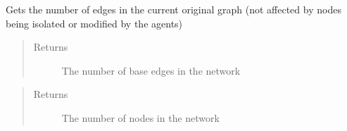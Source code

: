 \documentclass[letterpaper,10pt,english]{sphinxmanual}
\begin{document}
\begin{fulllineitems}
\begin{fulllineitems}
\begin{quote}
\begin{description}
\end{description}\end{quote}

\end{fulllineitems}


\begin{fulllineitems}
\label{\detokenize{source/yawning_titan.envs.generic.core:yawning_titan.envs.generic.core.network_interface.NetworkInterface.get_number_current_edges}}
\sphinxAtStartPar
Gets the number of edges in the current original graph (not affected by nodes being isolated or modified by the
agents)
\begin{quote}\begin{description}
\item[{Returns}] \leavevmode
\sphinxAtStartPar
The number of base edges in the network

\end{description}\end{quote}

\end{fulllineitems}


\begin{fulllineitems}
\label{\detokenize{source/yawning_titan.envs.generic.core:yawning_titan.envs.generic.core.network_interface.NetworkInterface.get_number_of_nodes}}\begin{quote}\begin{description}
\item[{Returns}] \leavevmode
\sphinxAtStartPar
The number of nodes in the network

\end{description}\end{quote}

\end{fulllineitems}


\end{fulllineitems}
\end{document}
